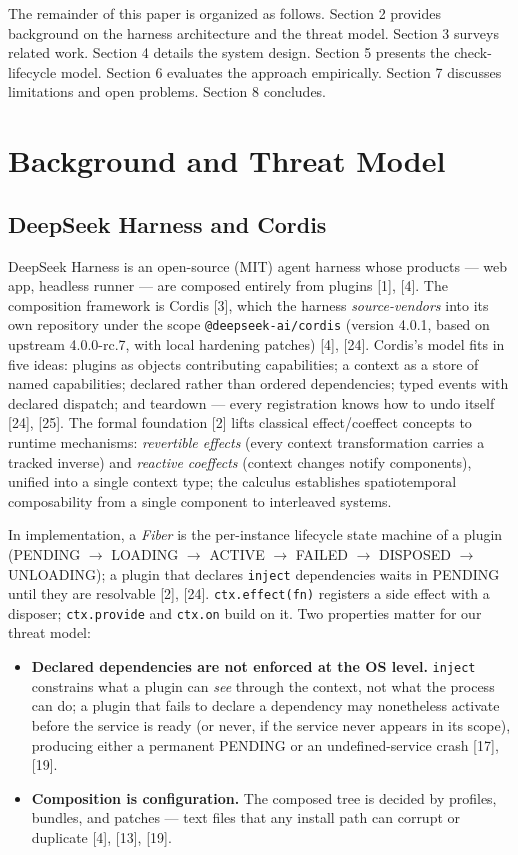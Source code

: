 \documentclass[11pt]{article}
\begin{document}
The remainder of this paper is organized as follows. Section 2 provides
background on the harness architecture and the threat model. Section 3
surveys related work. Section 4 details the system design. Section 5
presents the check-lifecycle model. Section 6 evaluates the approach
empirically. Section 7 discusses limitations and open problems. Section
8 concludes.

\section{Background and Threat
Model}\label{background-and-threat-model}

\subsection{DeepSeek Harness and
Cordis}\label{deepseek-harness-and-cordis}

DeepSeek Harness is an open-source (MIT) agent harness whose products
--- web app, headless runner --- are composed entirely from plugins
[1], [4]. The composition framework is Cordis [3], which the
harness \emph{source-vendors} into its own repository under the scope
\texttt{@deepseek-ai/cordis} (version 4.0.1, based on upstream
4.0.0-rc.7, with local hardening patches) [4], [24]. Cordis's
model fits in five ideas: plugins as objects contributing capabilities;
a context as a store of named capabilities; declared rather than ordered
dependencies; typed events with declared dispatch; and teardown ---
every registration knows how to undo itself [24], [25]. The
formal foundation [2] lifts classical effect/coeffect concepts to
runtime mechanisms: \emph{revertible effects} (every context
transformation carries a tracked inverse) and \emph{reactive coeffects}
(context changes notify components), unified into a single context type;
the calculus establishes spatiotemporal composability from a single
component to interleaved systems.

In implementation, a \emph{Fiber} is the per-instance lifecycle state
machine of a plugin (PENDING  $\to$  LOADING  $\to$  ACTIVE  $\to$  FAILED  $\to$  DISPOSED  $\to$ 
UNLOADING); a plugin that declares \texttt{inject} dependencies waits in
PENDING until they are resolvable [2], [24].
\texttt{ctx.effect(fn)} registers a side effect with a disposer;
\texttt{ctx.provide} and \texttt{ctx.on} build on it. Two properties
matter for our threat model:

\begin{itemize}
\item
  \textbf{Declared dependencies are not enforced at the OS level.}
  \texttt{inject} constrains what a plugin can \emph{see} through the
  context, not what the process can do; a plugin that fails to declare a
  dependency may nonetheless activate before the service is ready (or
  never, if the service never appears in its scope), producing either a
  permanent PENDING or an undefined-service crash [17], [19].
\item
  \textbf{Composition is configuration.} The composed tree is decided by
  profiles, bundles, and patches --- text files that any install path
  can corrupt or duplicate [4], [13], [19].
\end{itemize}
\end{document}
